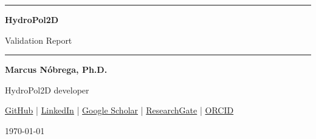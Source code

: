 \documentclass[11pt]{article}
\begin{document}
\hypersetup{pageanchor=false}
\begin{titlepage}
\thispagestyle{empty}
\centering
\vspace*{1.55in}
{\color{HydroBlue}\rule{0.18\textwidth}{1.4pt}}\par
\vspace{0.36in}
{\fontsize{30}{35}\selectfont\bfseries\color{HydroNavy} HydroPol2D}\par
\vspace{0.12in}
{\fontsize{19}{24}\selectfont\color{HydroGray} Validation Report}\par
\vspace{0.34in}
{\color{HydroBlue}\rule{0.56\textwidth}{0.7pt}}\par
\vfill
{\large\bfseries Marcus N\'obrega, Ph.D.}\par
\vspace{0.08in}
{\normalsize HydroPol2D developer}\par
\vspace{0.24in}
\small
\href{https://github.com/marcusnobrega-eng/HydroPol2D}{GitHub}
\enspace|\enspace
\href{https://www.linkedin.com/in/marcus-n%C3%B3brega-744b61138/}{LinkedIn}
\enspace|\enspace
\href{https://scholar.google.com/scholar?q=Marcus+N%C3%B3brega}{Google Scholar}
\enspace|\enspace
\href{https://www.researchgate.net/profile/Marcus-Gomes-Jr}{ResearchGate}
\enspace|\enspace
\href{https://orcid.org/0000-0002-8250-8195}{ORCID}\par
\vfill
{\small\color{HydroGray}\today}
\end{titlepage}
\setcounter{page}{1}
\hypersetup{pageanchor=true}

\begin{abstract}
This report documents the HydroPol2D validation suite. It evaluates formulas and numerical dynamics using analytical solutions, independent reference calculations, exact bookkeeping tests, benchmark hydrographs, and synthetic parameter-recovery cases. The shared spatial case-study domain is a V-tilted synthetic catchment, used to embed module-scale tests in a consistent HydroPol2D grid. The report includes canopy interception, snow, infiltration, evapotranspiration, groundwater and recharge, hydrodynamics, routing alternatives, Neal (2012) channel-subgrid hydraulics, reservoirs, boundary conditions, spatial rainfall, water-quality buildup and washoff, and human risk. Model results are compared with analytical solutions, independent calculations, exact storage ledgers, or documented fine-grid numerical references.
\end{abstract}
\end{document}
